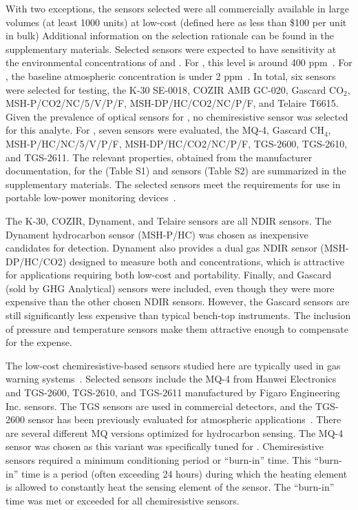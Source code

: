 \documentclass[sensors,article,submit,moreauthors,pdftex]{Definitions/mdpi}
\begin{document}
			With two exceptions, the sensors selected were all commercially available in large volumes (at least 1000 units) at low-cost (defined here as less than \$100 per unit in bulk)
			Additional information on the selection rationale can be found in the supplementary materials.
			Selected sensors were expected to have sensitivity at the environmental concentrations of  and .
			For , this level is around 400 ppm~\cite{blasing_recent_2016,dlugokencky_trends_2016}.
			For , the baseline atmospheric concentration is under 2 ppm~\cite{turner_large_2016,bamberger_spatial_2014,dlugokencky_trends_2016-1}.
			In total, six  sensors were selected for testing, the K-30 SE-0018, COZIR AMB GC-020, Gascard CO$_{2}$, MSH-P/CO2/NC/5/V/P/F, MSH-DP/HC/CO2/NC/P/F, and Telaire T6615.
			Given the prevalence of optical sensors for , no chemiresistive sensor was selected for this analyte.
			For , seven sensors were evaluated, the MQ-4, Gascard CH$_{4}$, MSH-P/HC/NC/5/V/P/F, MSH-DP/HC/CO2/NC/P/F, TGS-2600, TGS-2610, and TGS-2611.
			The relevant properties, obtained from the manufacturer documentation, for the  (Table S1) and  sensors (Table S2) are summarized in the supplementary materials.
			The selected sensors meet the requirements for use in portable low-power monitoring devices~\cite{karpov_energy_2013}.
			
			The K-30, COZIR, Dynament, and Telaire sensors are all NDIR  sensors.
			The Dynament hydrocarbon sensor (MSH-P/HC) was chosen as inexpensive candidates for  detection.
			Dynament also provides a dual gas NDIR sensor (MSH-DP/HC/CO2) designed to measure both  and  concentrations, which is attractive for applications requiring both low-cost and portability.
			Finally,  and  Gascard (sold by GHG Analytical) sensors were included, even though they were more expensive than the other chosen NDIR sensors.
			However, the Gascard sensors are still significantly less expensive than typical bench-top instruments.
			The inclusion of pressure and temperature sensors make them attractive enough to compensate for the expense.

			The low-cost chemiresistive-based  sensors studied here are typically used in gas warning systems~\cite{chiu_towards_2013}.
			Selected sensors include the MQ-4 from Hanwei Electronics and TGS-2600, TGS-2610, and TGS-2611 manufactured by Figaro Engineering Inc. sensors.
			The TGS sensors are used in commercial  detectors, and the TGS-2600 sensor has been previously evaluated for atmospheric applications~\cite{eugster_performance_2012,bossche_potential_2017}.
			There are several different MQ versions optimized for hydrocarbon sensing.
			The MQ-4 sensor was chosen as this variant was specifically tuned for .
			Chemiresistive sensors required a minimum conditioning period or ``burn-in'' time.
			This ``burn-in'' time is a period (often exceeding 24 hours) during which the heating element is allowed to constantly heat the sensing element of the sensor.
			The ``burn-in'' time was met or exceeded for all chemiresistive sensors.
			
\end{document}

